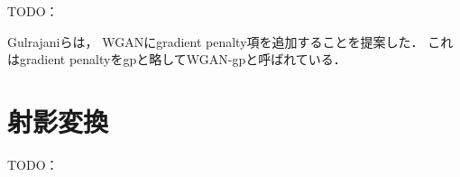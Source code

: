 \documentclass[\homedir/main.tex]{subfiles}
\begin{document}
TODO：

Gulrajaniら\cite{NIPS2017_892c3b1c}は，
WGANにgradient penalty項を追加することを提案した．
これはgradient penaltyをgpと略してWGAN-gpと呼ばれている．

\section{射影変換}\label{sec:projective_transformation}

TODO：

\printBibForSubfiles
\end{document}
